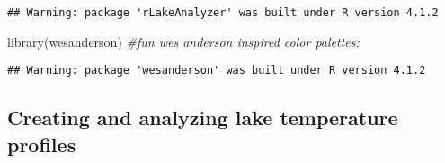 \documentclass[
]{article}
\newenvironment{Shaded}{\begin{snugshade}}{\end{snugshade}}
\newcommand{\AttributeTok}[1]{\textcolor[rgb]{0.77,0.63,0.00}{#1}}
\newcommand{\CommentTok}[1]{\textcolor[rgb]{0.56,0.35,0.01}{\textit{#1}}}
\newcommand{\FunctionTok}[1]{\textcolor[rgb]{0.00,0.00,0.00}{#1}}
\newcommand{\NormalTok}[1]{#1}
\newcommand{\OtherTok}[1]{\textcolor[rgb]{0.56,0.35,0.01}{#1}}
\newcommand{\SpecialCharTok}[1]{\textcolor[rgb]{0.00,0.00,0.00}{#1}}
\newcommand{\StringTok}[1]{\textcolor[rgb]{0.31,0.60,0.02}{#1}}
\begin{document}
\begin{verbatim}
## Warning: package 'rLakeAnalyzer' was built under R version 4.1.2
\end{verbatim}

\begin{Shaded}
\begin{Highlighting}[]
\FunctionTok{library}\NormalTok{(wesanderson) }\CommentTok{\#fun wes anderson inspired color palettes: }
\end{Highlighting}
\end{Shaded}

\begin{verbatim}
## Warning: package 'wesanderson' was built under R version 4.1.2
\end{verbatim}

\begin{Shaded}
\end{Shaded}

\hypertarget{creating-and-analyzing-lake-temperature-profiles}{%
\subsection{Creating and analyzing lake temperature
profiles}\label{creating-and-analyzing-lake-temperature-profiles}}
\end{document}
